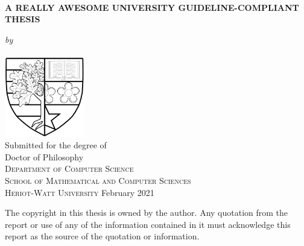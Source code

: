 \documentclass[a4paper,12pt]{report}
\date{\today}
\newcommand{\auth}{Your Name}
\newcommand{\thesistitle}{A Really Awesome University Guideline-Compliant Thesis}
\newcommand{\degree}{Doctor of Philosophy}
\newcommand{\supdate}{February 2021}
\begin{document}
\doublespacing

\pagestyle{empty}
\begin{center}
\begin{spacing}{2}
{\large{\ \\  \vspace{1.5cm}\textbf{\MakeUppercase{\thesistitle}}}}\\
\end{spacing}
\vfill
{\Large\textit{by}}\\\vspace{0.2cm}
{\Large\upshape{\auth}}\\\vspace{1.0cm}
\includegraphics[width=3.5cm]{fig/LogoBlack.jpg}\\
\vspace{1cm}
{\large Submitted for the degree of \\ \degree}\\
\vspace{1cm}
{\large\textsc{Department of Computer Science}\\
\textsc{School of Mathematical and Computer Sciences}\\
\textsc{Heriot-Watt University}}\vfill
{\large{\supdate}}
\end{center}
{\small The copyright in this thesis is owned by the author. Any quotation from the report or use of any of the information contained in it must acknowledge this report as the source of the quotation or information.}
\clearpage


\clearpage
\pagestyle{plain}
\clearpage{}

\tableofcontents
\listoftables
\listoffigures
\printacronyms %
\clearpage
\pagestyle{fancy}
\fancyhead{}
\lhead{\slshape \leftmark} 
\cfoot{\thepage}
\renewcommand{\headrulewidth}{0.4pt}
\renewcommand{\footrulewidth}{0.0pt}
\renewcommand{\chaptermark}[1]{\markboth{\chaptername\ \thechapter:\ #1}{}}
\end{document}
